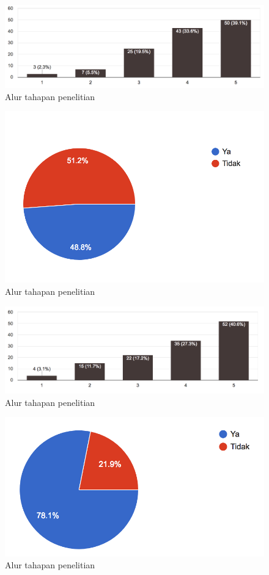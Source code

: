 \begin{figure}
	\includegraphics[width=\linewidth]{pics/perlu-waktu-luar-kelas}
	\caption{Alur tahapan penelitian}
	\centering
\end{figure}
\begin{figure}
	\includegraphics[width=\linewidth]{pics/pernah-ikut-ddp-sebelum}
	\caption{Alur tahapan penelitian}
	\centering
\end{figure}
\begin{figure}
	\includegraphics[width=\linewidth]{pics/slide-show-x-buku}
	\caption{Alur tahapan penelitian}
	\centering
\end{figure}
\begin{figure}
	\includegraphics[width=\linewidth]{pics/suka-bermain-game}
	\caption{Alur tahapan penelitian}
	\centering
\end{figure}
